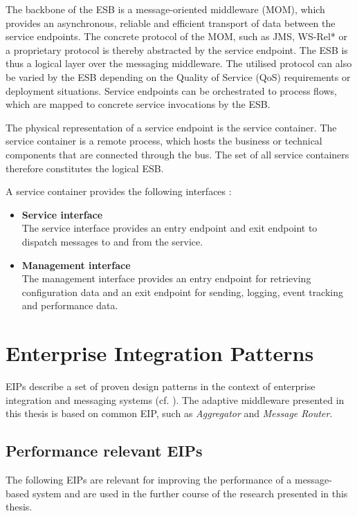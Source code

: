The backbone of the ESB is a message-oriented middleware (MOM), which provides an asynchronous, reliable and efficient transport of data between the service endpoints. The concrete protocol of the MOM, such as JMS, WS-Rel* or a proprietary protocol is thereby abstracted by the service endpoint. The ESB is thus a logical layer over the messaging middleware. The utilised protocol can also be varied by the ESB depending on the Quality of Service (QoS) requirements or deployment situations. Service endpoints can be orchestrated to process flows, which are mapped to concrete service invocations by the ESB.

The physical representation of a service endpoint is the service container. The service container is a remote process, which hosts the business or technical components that are connected through the bus. The set of all service containers therefore constitutes the logical ESB.

A service container provides the following interfaces \citep{Chappell:2004jo}:
\begin{itemize}
	\item \textbf{Service interface}\\
	The service interface provides an entry endpoint and exit endpoint to dispatch messages to and from the service.
	\item \textbf{Management interface}\\
	The management interface provides an entry endpoint for retrieving configuration data and an exit endpoint for sending, logging, event tracking and performance data.
\end{itemize}

\section{Enterprise Integration Patterns}
\label{sec:ch03_eip}

\acfp{EIP} describe a set of proven design patterns in the context of enterprise integration and messaging systems (cf. \cite{Hohpe:2003fk}). The adaptive middleware presented in this thesis is based on common \ac{EIP}, such as \emph{Aggregator} and \emph{Message Router}.

\subsection{Performance relevant \acp{EIP}}

The following \acp{EIP} are relevant for improving the performance of a message-based system and are used in the further course of the research presented in this thesis.

